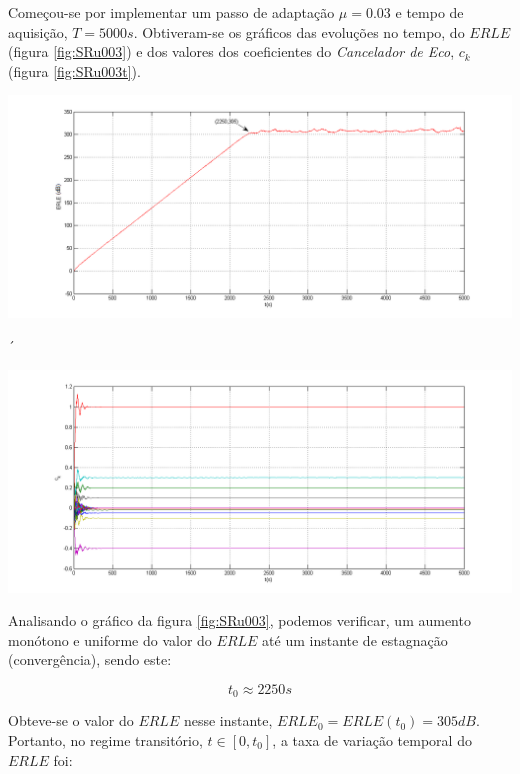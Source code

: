 \documentclass[a4paper,11pt]{report}
\begin{document}
Começou-se por implementar um passo de adaptação $\mu=0.03$ e tempo de aquisição, $T=5000s$. Obtiveram-se os gráficos  das evoluções no tempo, do $ERLE$ (figura \ref{fig:SRu003}) e dos valores dos coeficientes do \textit{Cancelador de Eco}, $c_k$ (figura \ref{fig:SRu003t}).


\begin{center}
     \includegraphics[angle=0,width=1\textwidth]{SRu003.png}
     \label{fig:SRu003}
     \end{center}
´

\begin{center}
     \includegraphics[angle=0,width=1\textwidth]{SRu003t.png}
     \label{fig:SRu003t}
     \end{center}

Analisando o gráfico da figura \ref{fig:SRu003}, podemos verificar, um aumento monótono e uniforme do valor do $ERLE$ até um instante de estagnação (convergência), sendo este:

$$t_{0}\approx2250s$$

Obteve-se o valor do $ERLE$ nesse instante, $ERLE_{0}=ERLE(t_{0})=305dB$. Portanto, no regime transitório, $t\in[0,t_{0}]$, a taxa de variação temporal do $ERLE$ foi:
\end{document}
